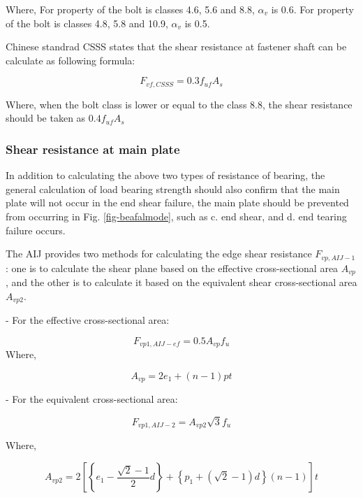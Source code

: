 Where, For property of the bolt is classes 4.6, 5.6 and 8.8, $\alpha_v$ is 0.6. For property of the bolt is classes 4.8, 5.8 and 10.9, $\alpha_v$ is 0.5.

Chinese standrad \ac{CSSS} states that the  shear resistance at fastener shaft can be calculate as following formula:

\begin{equation}
    F_{vf,CSSS} = 0.3 f_{uf}A_s
\end{equation}

Where, when the bolt class is lower or equal to the class 8.8, the shear resistance should be taken as $0.4f_{uf}A_s$


\subsubsection{Shear resistance at main plate}

In addition to calculating the above two types of resistance of bearing, the general calculation of load bearing strength should also confirm that the main plate will not occur in the end shear failure, the main plate should be prevented from occurring in Fig. \ref{fig-beafalmode}, such as c. end shear, and d. end tearing failure occurs.

The \ac{AIJ} \cite{2012AIJStructures} provides two methods for calculating the edge shear resistance $F_{vp,AIJ-1}$ : one is to calculate the shear plane based on the effective cross-sectional area $A_{vp}$, and the other is to calculate it based on the equivalent shear cross-sectional area $A_{vp2}$.

- For the effective cross-sectional area:

\begin{equation}
    F_{vp1,AIJ-ef} = 0.5 A_{vp}f_u
\end{equation}
Where, 

\begin{equation}
    A_{vp} = 2 {e_1 + (n-1)p}t
\end{equation}

- For the equivalent cross-sectional area:

\begin{equation}
    F_{vp1,AIJ-2} = A_{vp2}\sqrt{3}f_u
\end{equation}

Where,

\begin{equation}
A_{vp2}=2\left[\left\{e_1-\frac{\sqrt{2}-1}{2} d\right\}+\left\{p_1+(\sqrt{2}-1) d\right\}(n-1)\right] t
\end{equation}

